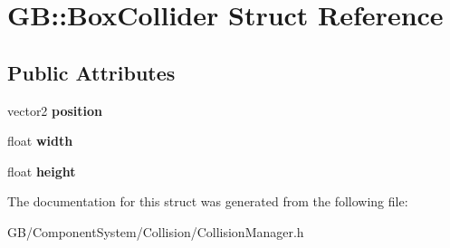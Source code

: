 \hypertarget{struct_g_b_1_1_box_collider}{}\section{GB\+::Box\+Collider Struct Reference}
\label{struct_g_b_1_1_box_collider}
\subsection*{Public Attributes}
\begin{DoxyCompactItemize}
\item 
\mbox{\label{struct_g_b_1_1_box_collider_a92a8a02f4f3baed4f43c7a61950cb4f7}} 
vector2 {\bfseries position}
\item 
\mbox{\label{struct_g_b_1_1_box_collider_a36246add888472cdcd71791d10c66c20}} 
float {\bfseries width}
\item 
\mbox{\label{struct_g_b_1_1_box_collider_a398ffbe227ea97fc3627730af1e62083}} 
float {\bfseries height}
\end{DoxyCompactItemize}


The documentation for this struct was generated from the following file\+:\begin{DoxyCompactItemize}
\item 
G\+B/\+Component\+System/\+Collision/Collision\+Manager.\+h\end{DoxyCompactItemize}
